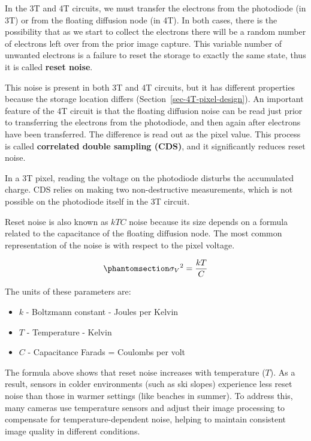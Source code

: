 \documentclass[
  letterpaper,
]{book}
\providecommand{\tightlist}{%
  \setlength{\itemsep}{0pt}\setlength{\parskip}{0pt}}\usepackage{longtable,booktabs,array}
\begin{document}
In the 3T and 4T circuits, we must transfer the electrons from the
photodiode (in 3T) or from the floating diffusion node (in 4T). In both
cases, there is the possibility that as we start to collect the
electrons there will be a random number of electrons left over from the
prior image capture. This variable number of unwanted electrons is a
failure to reset the storage to exactly the same state, thus it is
called \textbf{reset noise}.

This noise is present in both 3T and 4T circuits, but it has different
properties because the storage location differs
(Section~\ref{sec-4T-pixel-design}). An important feature of the 4T
circuit is that the floating diffusion noise can be read just prior to
transferring the electrons from the photodiode, and then again after
electrons have been transferred. The difference is read out as the pixel
value. This process is called \textbf{correlated double sampling (CDS)},
and it significantly reduces reset noise.

In a 3T pixel, reading the voltage on the photodiode disturbs the
accumulated charge. CDS relies on making two non-destructive
measurements, which is not possible on the photodiode itself in the 3T
circuit.

Reset noise is also known as \(kTC\) noise because its size depends on a
formula related to the capacitance of the floating diffusion node. The
most common representation of the noise is with respect to the pixel
voltage.

\begin{equation}\phantomsection\label{eq-ktc-volts}{
{\sigma_V}^2 = \frac{kT}{C}
}\end{equation}

The units of these parameters are:

\begin{itemize}
\tightlist
\item
  \(k\) - Boltzmann constant - Joules per Kelvin
\item
  \(T\) - Temperature - Kelvin
\item
  \(C\) - Capacitance Farads = Coulombs per volt
\end{itemize}

The formula above shows that reset noise increases with temperature
(\(T\)). As a result, sensors in colder environments (such as ski
slopes) experience less reset noise than those in warmer settings (like
beaches in summer). To address this, many cameras use temperature
sensors and adjust their image processing to compensate for
temperature-dependent noise, helping to maintain consistent image
quality in different conditions.
\end{document}
